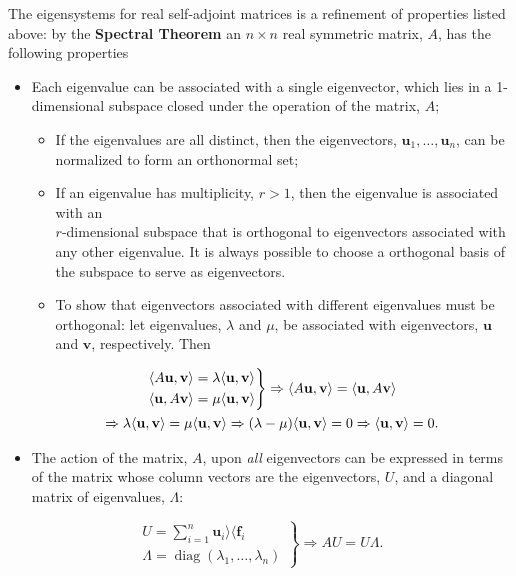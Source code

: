 \documentclass[12pt, twoside, draft]{article}
\begin{document}
The eigensystems for real self-adjoint matrices is a refinement of properties listed above: by the \textbf{Spectral Theorem} an $n \times n$ real symmetric matrix, $A$, has the following properties
 \begin{itemize}[noitemsep]
\item Each eigenvalue can be associated with a single eigenvector, which lies in a 1-dimensional subspace closed under the operation of the matrix, $A$;
\begin{itemize}[noitemsep]
\item If the eigenvalues are all distinct, then the eigenvectors, $\mathbf{u}_1, \ldots, \mathbf{u}_n$, can be normalized to form an orthonormal set;
\item If an eigenvalue has multiplicity, $r > 1$, then the eigenvalue is associated with an \\  $r$-dimensional subspace that is orthogonal to eigenvectors associated with any other eigenvalue.  It is always possible to choose a orthogonal basis of the subspace to serve as eigenvectors.
\item To show that eigenvectors associated with different eigenvalues must be orthogonal: let eigenvalues, $\lambda$ and $\mu$, be associated with eigenvectors, $\mathbf{u}$ and $\mathbf{v}$, respectively.  Then
\end{itemize}
\begin{multline}\label{eq:spectral_eigenvectors}
\begin{rcases}
\langle A \mathbf{u}, \mathbf{v} \rangle = \lambda \langle \mathbf{u}, \mathbf{v} \rangle \\
\langle \mathbf{u}, A \mathbf{v} \rangle = \mu \langle \mathbf{u}, \mathbf{v} \rangle
\end{rcases}
\Rightarrow \langle A \mathbf{u}, \mathbf{v} \rangle = \langle \mathbf{u}, A \mathbf{v} \rangle \\
\Rightarrow \lambda \langle \mathbf{u}, \mathbf{v} \rangle = \mu \langle \mathbf{u}, \mathbf{v} \rangle
\Rightarrow (\lambda - \mu) \langle \mathbf{u}, \mathbf{v} \rangle = 0
\Rightarrow \langle \mathbf{u}, \mathbf{v} \rangle = 0.
\end{multline}
\item The action of the matrix, $A$, upon \textit{all} eigenvectors can be expressed in terms of the matrix whose column vectors are the eigenvectors, $U$, and a diagonal matrix of eigenvalues, $\Lambda$:
\end{itemize}
\begin{equation}\label{eq:eigensystem_full_symmetric}
\left.
\begin{array}{l}
U = \sum_{i=1}^n \mathbf{u}_i \rangle \langle \mathbf{f}_i \\
\Lambda = \operatorname{diag}(\lambda_1, \ldots, \lambda_n)
\end{array}
\right\}
\Rightarrow A U = U \Lambda.
\end{equation}
\end{document}
